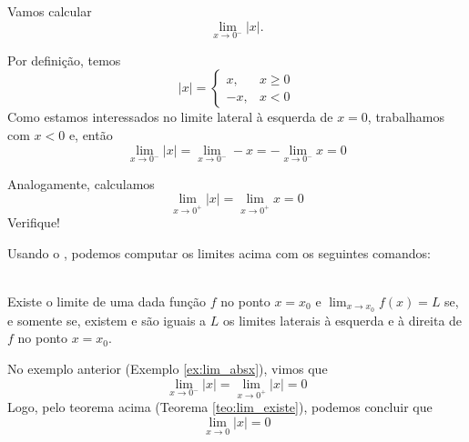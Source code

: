 \cleardoublepage\documentclass[../main.tex]{subfiles}
\begin{document}
\begin{ex}\label{ex:lim_absx}
  Vamos calcular
  \begin{equation*}
    \lim_{x\to 0^-} |x|.
  \end{equation*}
  \begin{solution}
Por definição, temos
  \begin{equation*}
    |x| = \left\{
      \begin{array}{ll}
        x, & x\geq 0\\
        -x, & x< 0
      \end{array}
    \right.
  \end{equation*}
  Como estamos interessados no limite lateral à esquerda de $x=0$, trabalhamos com $x<0$ e, então
  \begin{equation*}
    \lim_{x\to 0^-} |x| = \lim_{x\to 0^-} -x = -\lim_{x\to 0^-} x = 0
  \end{equation*}
  
  Analogamente, calculamos
  \begin{equation*}
    \lim_{x\to 0^+} |x| = \lim_{x\to 0^+} x = 0
  \end{equation*}
  Verifique!

  
  Usando o \geogebra, podemos computar os limites acima com os seguintes comandos:
  \end{solution}
\end{ex}

\begin{framed}\begin{teo}~\label{teo:lim_existe}
 \\ Existe o limite de uma dada função $f$ no ponto $x=x_0$ e $\displaystyle\lim_{x\to x_0} f(x) = L$ se, e somente se, existem e são iguais a $L$ os limites laterais à esquerda e à direita de $f$ no ponto $x=x_0$.
\end{teo}\end{framed}
\begin{ex}
  No exemplo anterior (Exemplo \ref{ex:lim_absx}), vimos que
  \begin{equation*}
    \lim_{x\to 0^-} |x| = \lim_{x\to 0^+} |x| = 0
  \end{equation*}
  Logo, pelo teorema acima (Teorema \ref{teo:lim_existe}), podemos concluir que
  \begin{equation*}
    \lim_{x\to 0} |x| = 0
  \end{equation*}
\end{ex}
\end{document}
